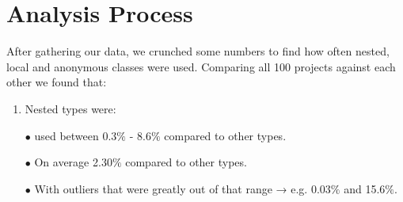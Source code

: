 \documentclass{assignment}
\begin{document}
\section*{Analysis Process}

After gathering our data, we crunched some numbers to find how often nested, local and anonymous classes were used. Comparing all 100 projects against each other we found that:\\
\begin{enumerate}
\item Nested types were:
\item[$\bullet$]used between 0.3$\%$ - 8.6$\%$ compared to other types.
 \item[$\bullet$] On average 2.30$\%$ compared to other types.
 \item[$\bullet$] With outliers that were greatly out of that range → e.g. 0.03$\%$ and 15.6$\%$. \\


\end{enumerate}
\end{document}
